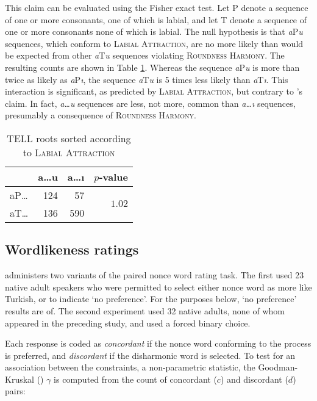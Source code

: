 \noindent 
This claim can be evaluated using the Fisher exact test. Let P denote a sequence of one or more consonants, one of which is labial, and let T denote a sequence of one or more consonants none of which is labial. 
The null hypothesis is that \emph{a}P\emph{u} sequences, which conform to \textsc{Labial Attraction}, are no more likely than would be expected from other \emph{a}T\emph{u} sequences violating \textsc{Roundness Harmony}. 
The resulting counts are shown in Table \ref{las}.
Whereas the sequence \emph{a}P\emph{u} is more than twice as likely as \emph{a}P\emph{ı}, the sequence \emph{a}T\emph{u} is 5 times less likely than \emph{a}T\emph{ı}. 
This interaction is significant, as predicted by \textsc{Labial Attraction}, but contrary to \citeauthor{Clements1982}'s claim.
In fact, \emph{a\ldots{}u} sequences are less, not more, common than \emph{a\ldots{}ı} sequences, presumably a consequence of \textsc{Roundness Harmony}.

\begin{table}[t]
\centering
\begin{tabular}{lrrr}
\toprule
       & a\ldots{}u & a\ldots{}ı & $p$-value                      \\
\midrule
aP\ldots{} & 124    & 57     & \multirow{2}{*}{$1.02$\e{-36}} \\
aT\ldots{} & 136    & 590    &                                \\
\bottomrule
\end{tabular}
\caption{TELL roots sorted according to \textsc{Labial Attraction}}
\label{las}
\end{table}

\subsection{Wordlikeness ratings}

\citet{Zimmer1969} administers two variants of the paired nonce word rating task. The first used 23 native adult speakers who were permitted to select either nonce word as more like Turkish, or to indicate `no preference'. For the purposes below, `no preference' results are of. The second experiment used 32 native adults, none of whom appeared in the preceding study, and used a forced binary choice.

Each response is coded as \emph{concordant} if the nonce word conforming to the process is preferred, and \emph{discordant} if the disharmonic word is selected. 
To test for an association between the constraints, a non-parametric statistic, the Goodman-Kruskal (\citeyear{Goodman1954}) $\gamma$ is computed from the count of concordant ($c$) and discordant ($d$) pairs:

